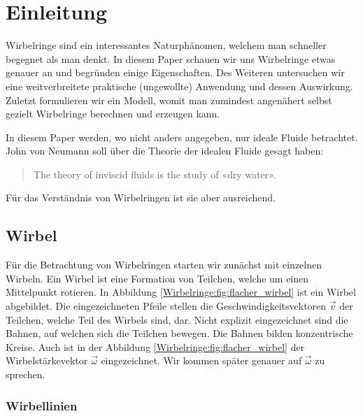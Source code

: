 %
%
%
\section{Einleitung}

Wirbelringe sind ein interessantes Naturphänomen, welchem man schneller begegnet als man denkt. 
In diesem Paper schauen wir uns Wirbelringe etwas genauer an und begründen einige Eigenschaften. 
Des Weiteren untersuchen wir eine weitverbreitete praktische (ungewollte) Anwendung und dessen Auswirkung. 
Zuletzt formulieren wir ein Modell, womit man zumindest angenähert selbst gezielt Wirbelringe berechnen und erzeugen kann.

In diesem Paper werden, wo nicht anders angegeben, nur ideale Fluide betrachtet.
John von Neumann soll über die Theorie der idealen Fluide gesagt haben\cite{Wirbelringe:feynman1964lectures}: 

\begin{quote}
    The theory of inviscid fluids is the study of «dry water».
\end{quote}

Für das Verständnis von Wirbelringen ist sie aber ausreichend.

\subsection{Wirbel}



Für die Betrachtung von Wirbelringen starten wir zunächst mit einzelnen Wirbeln.
Ein Wirbel ist eine Formation von Teilchen, welche um einen Mittelpunkt rotieren.
In Abbildung \ref{Wirbelringe:fig:flacher_wirbel} ist ein Wirbel abgebildet.
Die eingezeichneten Pfeile stellen die Geschwindigkeitsvektoren \( \vec{v} \) der Teilchen, welche Teil des Wirbels sind, dar.
Nicht explizit eingezeichnet sind die Bahnen, auf welchen sich die Teilchen bewegen.
Die Bahnen bilden konzentrische Kreise.
Auch ist in der Abbildung \ref{Wirbelringe:fig:flacher_wirbel} der Wirbelstärkevektor \(\vec{\omega}\) eingezeichnet.
Wir kommen später genauer auf \(\vec{\omega}\) zu sprechen.

\subsubsection*{Wirbellinien\label{Wirbelringe:Wirbellinien}}

